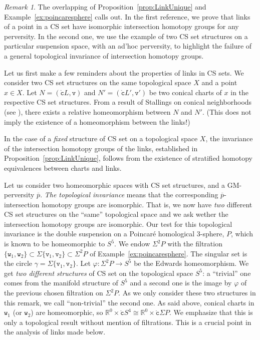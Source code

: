 \documentclass[a4paper,10pt,english,reqno]{amsart}
\theoremstyle{plain}
\theoremstyle{definition}
\theoremstyle{remark}
\newtheorem{remark}[proposition]{Remark}
\numberwithin{equation}{section}
\newcommand{\propref}[1]{Proposition~\ref{#1}}
\newcommand{\exemref}[1]{Example~\ref{#1}}
\def\R{{\mathbb R}}
\def\ov{\overline}
\def\tc{{\mathtt c}}
\def\tv{{\mathtt v}}
\def\tw{{\mathtt w}}
\def\R{\mathbb{R}}
\def\rc{{\mathring{\tc}}}
\renewcommand\1{\hbox{\ding{192}}}
\renewcommand\2{\hbox{\ding{193}}}
\newcommand\3{\hbox{\ding{194}}}
\newcommand\4{\hbox{\ding{195}}}
\begin{document}
\begin{remark}\label{rem:overlap}
The overlapping of \propref{prop:LinkUnique} and \exemref{ex:poincaresphere} calls out. 
In the first reference, we prove that links of a point in a CS set have isomorphic intersection homotopy groups 
for any perversity. In the second one, we use the example of two CS set structures  on a particular suspension space,
with an ad'hoc perversity, to highlight 
the  failure of a general topological invariance of intersection homotopy groups.
 

 \smallskip
 Let us first make a few reminders about the properties of links in CS sets. 
 We  consider two CS set structures on the same topological space $X$ and a point $x\in X$.
 Let $N=(\rc L,\tv)$ and $N'=(\rc L',\tv')$ be two conical charts of $x$ in the respective CS set structures.
 From a result of Stallings on conical neighborhoods (see \cite[Corollary 2.10.2]{FriedmanBook}),
 there exists a relative homeomorphism between $N$ and $N'$.
  (This does not imply the existence of a homeomorphism between the links!) 
 
 \smallskip
 In the case of a \emph{fixed} structure of CS set on a topological space $X$, the invariance of the intersection
 homotopy groups of the links, established in  \propref{prop:LinkUnique},
 follows from the existence of stratified homotopy equivalences between charts and links. 
 
 \smallskip
 Let us consider two homeomorphic spaces with CS set structures, and a GM-perversity $\ov{p}$.
\emph{The topological invariance} means that the corresponding $\ov{p}$-intersection homotopy groups are isomorphic. 
That is, we now have \emph{two} different CS set structures on the ``same'' topological space and we ask wether
the intersection homotopy groups are isomorphic.
Our test for this topological invariance is the double suspension on a Poincar\'e homological 3-sphere, $P$,
which is known to be homeomorphic to $S^5$. 
%
 We endow  $\Sigma^2 P$ with the filtration
 $\{\tw_{1},\tw_{2}\}\subset \Sigma\{\tv_{1}, \tv_{2}\}\subset \Sigma^2 P$
 of \exemref{ex:poincaresphere}.
 The singular set is the circle $\gamma= \Sigma\{\tv_{1}, \tv_{2}\}$.
% 
% 
Let $\varphi\colon \Sigma^2 P\to S^5$ be the Edwards homeomorphism. 
 We get \emph{two different structures} of CS set on the topological space $S^5$:
a ``trivial'' one comes from the manifold structure of $S^5$ and a second one is the image by $\varphi$
of the previous chosen filtration on $\Sigma^2 P$.
As we only consider  these two structures in this remark, we call ``non-trivial'' the second one.
%
As said above,  conical charts in $\tw_{1}$ (or $\tw_{2}$)
are homeomorphic, so
$\R^0\times \rc S^4\cong \R^0 \times \rc \Sigma P$.
We emphasize that this is only a topological result without mention of filtrations. 
This is a crucial point in the analysis of links made below.


\end{remark}
\end{document}
